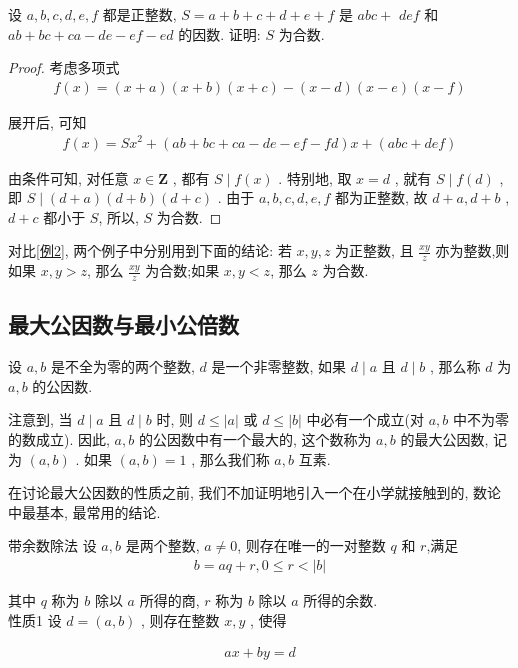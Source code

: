 \begin{example}
	设 $a ,  b ,  c ,  d ,  e ,  f$ 都是正整数,  $S=a+b+c+d+e+f$ 是 $a b c+$ $d e f$ 和 $a b+b c+c a-d e-e f-e d$ 的因数. 证明: $S$ 为合数.
\end{example}
\begin{proof}
	考虑多项式
\begin{align*}
		f(x)=(x+a)(x+b)(x+c)-(x-d)(x-e)(x-f)
	\end{align*}

	展开后, 可知
\begin{align*}
		f(x)=S x^{2}+(a b+b c+c a-d e-e f-f d) x+(a b c+d e f)
	\end{align*}

	由条件可知, 对任意 $x \in \mathbf{Z}$ , 都有 $S \mid f(x)$ . 特别地, 取 $x=d$ , 就有 $S \mid f(d)$ , 即 $S \mid(d+a)(d+b)(d+c)$ . 由于 $a ,  b ,  c ,  d ,  e ,  f$ 都为正整数, 故 $d+a ,  d+b$ ,  $d+c$ 都小于 $S$, 所以, $S$ 为合数.
\end{proof}
\begin{note}
	对比\ref{例2}, 两个例子中分别用到下面的结论: 若 $x ,  y ,  z$ 为正整数, 且 $\frac{x y}{z}$ 亦为整数,则如果 $x ,  y>z$, 那么 $\frac{x y}{z}$ 为合数;如果 $x ,  y<z$, 那么 $z$ 为合数.
\end{note}

\subsection{最大公因数与最小公倍数}
设 $a ,  b$ 是不全为零的两个整数, $d$ 是一个非零整数, 如果 $d \mid a$ 且 $d \mid b$ , 那么称 $d$ 为 $a ,  b$ 的公因数.

注意到, 当 $d \mid a$ 且 $d \mid b$ 时, 则 $d \leqslant|a|$ 或 $d \leqslant|b|$ 中必有一个成立(对 $a ,  b$ 中不为零的数成立). 因此, $a ,  b$ 的公因数中有一个最大的, 这个数称为 $a ,  b$ 的最大公因数, 记为 $(a, b)$ . 如果 $(a, b)=1$ , 那么我们称 $a ,  b$ 互素.

在讨论最大公因数的性质之前, 我们不加证明地引入一个在小学就接触到的, 数论中最基本, 最常用的结论.

带余数除法 设 $a ,  b$ 是两个整数, $a \neq 0$, 则存在唯一的一对整数 $q$ 和 $r$,满足
\begin{align*}
	b=a q+r, 0 \leqslant r<|b|
\end{align*}

其中 $q$ 称为 $b$ 除以 $a$ 所得的商, $r$ 称为 $b$ 除以 $a$ 所得的余数.\\
性质1 设 $d=(a, b)$ , 则存在整数 $x ,  y$ , 使得

\begin{align*}
	a x+b y=d
\end{align*}

